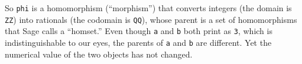 %
So \verb?phi? is a homomorphism (``morphism'') that converts integers (the domain is \verb?ZZ?) into rationals (the codomain is \verb?QQ?), whose parent is a set of homomorphisms that Sage calls a ``homset.''  Even though \verb?a? and \verb?b? both print as \verb?3?, which is indistinguishable to our eyes, the parents of \verb?a? and \verb?b? are different.  Yet the numerical value of the two objects has not changed.
%




